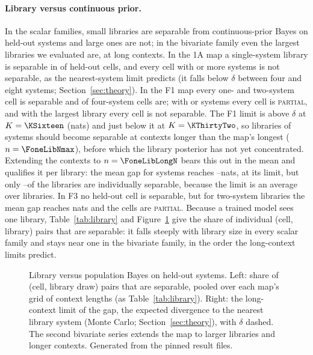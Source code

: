 \paragraph{Library versus continuous prior.} In the scalar families, small libraries are separable from continuous-prior Bayes
on held-out systems and large ones are not; in the bivariate family even the largest libraries we evaluated are, at long
contexts. In the 1A map a single-system library is separable in \LibOneAKone of \LibOneACells held-out cells, and
every cell with \LibBigKOneA or more systems is not separable, as the nearest-system limit predicts (it falls below $\delta$
between four and eight systems; Section~\ref{sec:theory}). In the F1 map every one- and two-system cell is separable and
\LibFoneKfour of \LibFoneCells four-system cells are; with \KSixteen or \KThirtyTwo systems every cell is
\textsc{partial}, and with the largest library every cell is not separable. The F1 limit is above $\delta$ at
$K=\KSixteen$ (\NaUnknownSixteen nats) and just below it at $K=\KThirtyTwo$, so libraries of \KSixteen systems should become
separable at contexts longer than the map's longest ($n=\FoneLibNmax$), before which the library posterior has not yet
concentrated. Extending the contexts to $n=\FoneLibLongN$ bears this out in the mean and qualifies it per library: the mean
gap for \KSixteen systems reaches \FoneLibSixteenMin--\FoneLibSixteenMax nats, at its limit, but only
\FoneLibSixteenShareMin--\FoneLibSixteenShareMax of the libraries are individually separable, because the limit is an average
over libraries. In F3 no held-out cell is separable, but for two-system libraries the mean gap
reaches \FthreeLibKtwo nats and the cells are \textsc{partial}. Because a trained model sees one library, Table~\ref{tab:library}
and Figure~\ref{fig:library} give the share of individual (cell, library) pairs that are separable: it falls steeply with
library size in every scalar family and stays near one in the bivariate family, in the order the long-context limits predict.

\begin{figure}[t]
\centering

\caption{Library versus population Bayes on held-out systems. Left: share of (cell, library draw) pairs that are separable,
pooled over each map's grid of context lengths (as Table~\ref{tab:library}). Right: the long-context limit of the gap, the
expected divergence to the nearest library system (Monte Carlo; Section~\ref{sec:theory}), with $\delta$ dashed. The
second bivariate series extends the map to larger libraries and longer contexts. Generated from the pinned result files.}
\label{fig:library}
\end{figure}

